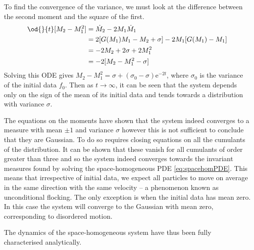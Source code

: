       To find the convergence of the variance, we must look at the difference between the second moment and the square of the first.
      \begin{align*}
      \od{}{t}\lbrack M_2 - M_1^2\rbrack &= \dot{M}_2 - 2M_1\dot{M}_1\\
      &= 2\lbrack G(M_1)M_1 - M_2 +\sigma\rbrack - 2M_1\lbrack G(M_1) - M_1\rbrack\\
      &= -2M_2 +2\sigma + 2M_1^2\\
      &= -2\lbrack M_2 - M_1^2 -\sigma\rbrack             
      \end{align*}
      Solving this ODE gives $M_2-M_1^2 = \sigma +(\sigma_0-\sigma)\mathrm{e}^{-2t}$, where $\sigma_0$ is the variance of the initial data $f_0$. Then as $t \to \infty$, it can be seen that the system depends only on the sign of the mean of its initial data and tends towards a distribution with variance $\sigma$.
      
      The equations on the moments have shown that the system indeed converges to a measure with mean $\pm 1$ and variance $\sigma$ however this is not sufficient to conclude that they are Gaussian. To do so requires closing equations on all the cumulants of the distribution. It can be shown that these vanish for all cumulants of order greater than three and so the system indeed converges towards the invariant measures found by solving the space-homogeneous PDE \eqref{eq:spacehomPDE}. This means that irrespective of initial data, we expect all particles to move on average in the same direction with the same velocity -- a phenomenon known as unconditional flocking. The only exception is when the initial data has mean zero. In this case the system will converge to the Gaussian with mean zero, corresponding to disordered motion.
      
      The dynamics of the space-homogeneous system have thus been fully characterised analytically.